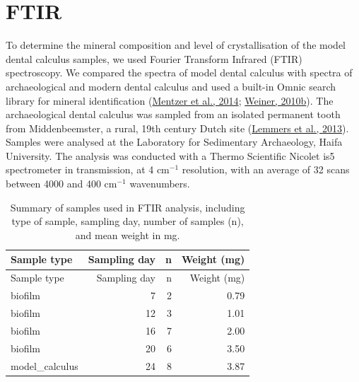 \documentclass[
  letterpaper,
]{book}
\begin{document}
\hypertarget{ftir}{%
\section{FTIR}\label{ftir}}

To determine the mineral composition and level of crystallisation of the
model dental calculus samples, we used Fourier Transform Infrared (FTIR)
spectroscopy. We compared the spectra of model dental calculus with
spectra of archaeological and modern dental calculus and used a built-in
Omnic search library for mineral identification
(\protect\hyperlink{ref-mentzerDistributionAuthigenic2014}{Mentzer et
al., 2014};
\protect\hyperlink{ref-weinerInfraredSpectroscopy2010}{Weiner, 2010b}).
The archaeological dental calculus was sampled from an isolated
permanent tooth from Middenbeemster, a rural, 19th century Dutch site
(\protect\hyperlink{ref-lemmersMiddenbeemster2013}{Lemmers et al.,
2013}). Samples were analysed at the Laboratory for Sedimentary
Archaeology, Haifa University. The analysis was conducted with a Thermo
Scientific Nicolet is5 spectrometer in transmission, at 4 cm\(^{-1}\)
resolution, with an average of 32 scans between 4000 and 400 cm\(^{-1}\)
wavenumbers.

\hypertarget{tbl-ftir-byoc}{}
\begin{longtable}[]{@{}lrrr@{}}
\caption{\label{tbl-ftir-byoc}Summary of samples used in FTIR analysis,
including type of sample, sampling day, number of samples (n), and mean
weight in mg.}\tabularnewline
\toprule\noalign{}
Sample type & Sampling day & n & Weight (mg) \\
\midrule\noalign{}
\endfirsthead
\toprule\noalign{}
Sample type & Sampling day & n & Weight (mg) \\
\midrule\noalign{}
\endhead
\bottomrule\noalign{}
\endlastfoot
biofilm & 7 & 2 & 0.79 \\
biofilm & 12 & 3 & 1.01 \\
biofilm & 16 & 7 & 2.00 \\
biofilm & 20 & 6 & 3.50 \\
model\_calculus & 24 & 8 & 3.87 \\
\end{longtable}
\end{document}
